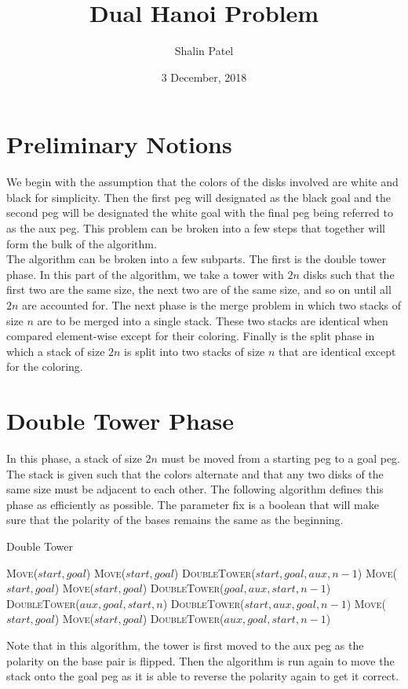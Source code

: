 \documentclass[fontsize = 10pt]{scrartcl}
\title{Dual Hanoi Problem}
\author{Shalin Patel}
\date{3 December, 2018}
\begin{document}
\maketitle

\section{Preliminary Notions}
We begin with the assumption that the colors of the disks involved are white and black for simplicity. Then the first peg will designated as the black goal and the second peg will be designated the white goal with the final peg being referred to as the aux peg. This problem can be broken into a few steps that together will form the bulk of the algorithm. \\

The algorithm can be broken into a few subparts. The first is the double tower phase. In this part of the algorithm, we take a tower with $2n$ disks such that the first two are the same size, the next two are of the same size, and so on until all $2n$ are accounted for.  The next phase is the merge problem in which two stacks of size $n$ are to be merged into a single stack. These two stacks are identical when compared element-wise except for their coloring. Finally is the split phase in which a stack of size $2n$ is split into two stacks of size $n$ that are identical except for the coloring. 

\section{Double Tower Phase}
In this phase, a stack of size $2n$ must be moved from a starting peg to a goal peg. The stack is given such that the colors alternate and that any two disks of the same size must be adjacent to each other. The following algorithm defines this phase as efficiently as possible. The parameter fix is a boolean that will make sure that the polarity of the bases remains the same as the beginning. 

\begin{algorithm}[H]
\caption{Double Tower}
\begin{algorithmic}[1]
\State \textsc{Move}($start, goal$)
\State \textsc{Move}($start, goal$)
\Else
{}
\State \textsc{DoubleTower}($start, goal, aux, n-1$)
\State \textsc{Move}($start, goal$)
\State \textsc{Move}($start, goal$)
\State \textsc{DoubleTower}($goal, aux, start, n-1$) 
\State \textsc{DoubleTower}($aux, goal, start, n$) 
\Else
\State \textsc{DoubleTower}($start, aux, goal, n-1$)
\State \textsc{Move}($start, goal$)
\State \textsc{Move}($start, goal$)
\State \textsc{DoubleTower}($aux, goal, start, n-1$)
\EndIf
\EndIf
\EndProcedure
\end{algorithmic}
\end{algorithm}
Note that in this algorithm, the tower is first moved to the aux peg as the polarity on the base pair is flipped. Then the algorithm is run again to move the stack onto the goal peg as it is able to reverse the polarity again to get it correct.
\end{document}
